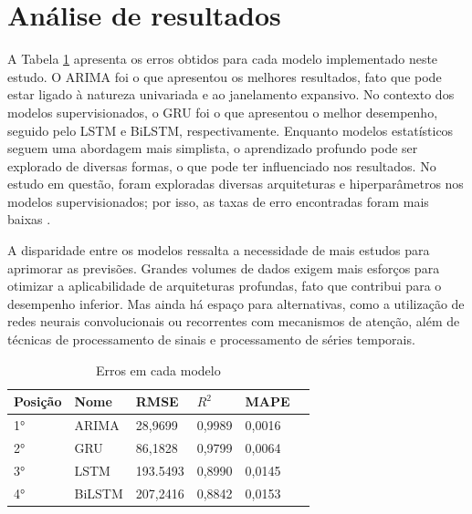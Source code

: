 \section{Análise de resultados}

  A Tabela \ref{tab:erros} apresenta os erros obtidos para cada modelo implementado neste estudo. O ARIMA foi o que apresentou os melhores resultados, fato que pode estar ligado à natureza univariada e ao janelamento expansivo.
  No contexto dos modelos supervisionados, o GRU foi o que apresentou o melhor desempenho, seguido pelo LSTM e BiLSTM, respectivamente.
  Enquanto modelos estatísticos seguem uma abordagem mais simplista, o aprendizado profundo pode ser explorado de diversas formas, o que pode ter influenciado nos resultados.
 No estudo em questão, foram exploradas diversas arquiteturas e hiperparâmetros nos modelos supervisionados; por isso, as taxas de erro encontradas foram mais baixas .

A disparidade entre os modelos ressalta a necessidade de mais estudos para aprimorar as previsões.
Grandes volumes de dados exigem mais esforços para otimizar a aplicabilidade de arquiteturas profundas, fato que contribui para o desempenho inferior.
  Mas ainda há espaço para alternativas, como a utilização de redes neurais convolucionais ou recorrentes com mecanismos de atenção, além de técnicas de processamento de sinais e processamento de séries temporais.
  
\begin{table}[!htb]
  \caption{Erros em cada modelo} \label{tab:erros}
  \begin{tabularx}{\textwidth}{X|X|X|X|X|X}
  \hline
  Posição & Nome & RMSE & $R^2$ & MAPE \\ \hline
  1° & ARIMA   & 28,9699      & 0,9989           & 0,0016             \\ \hline
  2° & GRU   & 86,1828      & 0,9799             & 0,0064             \\ \hline
  3° & LSTM   & 193.5493      &  0,8990           & 0,0145                \\ \hline
  4° & BiLSTM   & 207,2416    & 0,8842            & 0,0153           \\ \hline
  \end{tabularx}
\end{table}